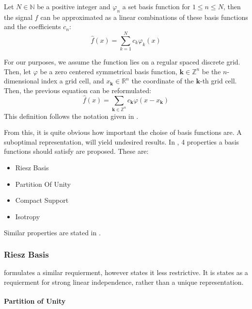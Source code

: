 \begin{definition}
    \label{def:permissible_representation}
    Let $N \in \mathbb{N}$ be a positive integer and $\varphi_n$ a set basis function for 
    $1 \leq n \leq N$, then the signal $f$ can be approximated as a linear combinations
    of these basis functions and the coefficients $c_n$:
    \[ \hat{f}(x) = \sum_{k=1}^{N} c_k \varphi_k(x) \] 

    For our purposes, we assume the function lies on a regular spaced discrete grid. Then, let
    $\varphi$ be a zero centered symmetrical basis function, $\bm{k} \in \mathbb{Z}^n$ be the
    $n$-dimensional index a grid cell, and $x_{\bm{k}} \in \mathbb{R}^n$ the coordinate of the 
    $\bm{k}$-th grid cell. Then, the previous equation can be reformulated:
    \[ \hat{f}(x) = \sum_{\bm{k} \in \mathbb{Z}^n} c_{\bm{k}} \varphi(x - x_{\bm{k}}) \] 
    This definition follows the notation given in \cite{momey_new_2011}.
\end{definition}

From this, it is quite obvious how important the choise of basis functions are. 
A suboptimal representation, will yield undesired results. In \cite{nilchian_optimized_2015}, 4 
properties a basis functions should satisfy are proposed. These are:
\begin{itemize}
    \item Riesz Basis
    \item Partition Of Unity
    \item Compact Support
    \item Isotropy
\end{itemize}

Similar properties are stated in \cite{hanson_local_1985}.

\subsubsection{Riesz Basis}


\cite{hanson_local_1985} formulates a similar requierment, however states it less restrictive. It is
states as a requierment for strong linear independence, rather than a unique representation.
 
\paragraph{Partition of Unity}
 
